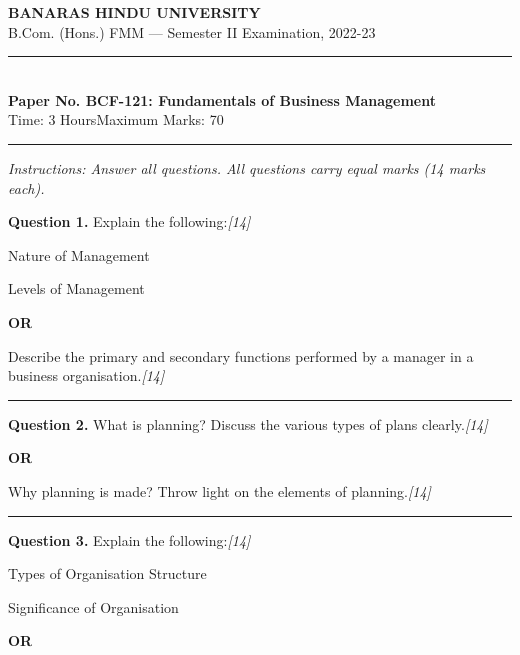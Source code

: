 \documentclass[11pt,a4paper]{article}
\newcommand{\pts}[1]{\hfill   \textit{[#1]}}
\begin{document}
\begin{center}
  {\large\bfseries BANARAS HINDU UNIVERSITY}\\[2pt]
  {\normalsize B.Com. (Hons.) FMM --- Semester II Examination, 2022-23}\\[6pt]
  \rule{0.8\linewidth}{0.5pt}\\[6pt]
  {\large\bfseries Paper No. BCF-121: Fundamentals of Business Management}\\[4pt]
  {\normalsize Time: 3 Hours\hfill Maximum Marks: 70}
\end{center}

\rule{\linewidth}{0.4pt}

\smallskip



\noindent   \textit{Instructions: Answer all questions. All questions carry equal marks (14 marks each).}

\bigskip




\noindent   \textbf{Question 1.}
Explain the following:\pts{14}

\begin{parts}
  \item Nature of Management
  \item Levels of Management
\end{parts}

\centerline{   \textbf{OR}}

Describe the primary and secondary functions performed by a manager in a business organisation.\pts{14}

\medskip\rule{\linewidth}{0.2pt}




\noindent   \textbf{Question 2.}
What is planning? Discuss the various types of plans clearly.\pts{14}

\centerline{   \textbf{OR}}

Why planning is made? Throw light on the elements of planning.\pts{14}

\medskip\rule{\linewidth}{0.2pt}




\noindent   \textbf{Question 3.}
Explain the following:\pts{14}

\begin{parts}
  \item Types of Organisation Structure
  \item Significance of Organisation
\end{parts}

\centerline{   \textbf{OR}}
\end{document}
